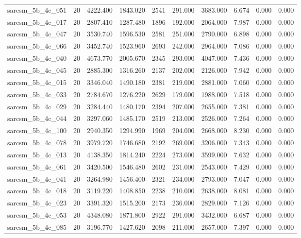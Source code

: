 \begin{tabular}{lrrrrrrrrr}
sarcsm\_5b\_4c\_051 & 20 & 4222.400 & 1843.020 & 2541 & 291.000 & 3683.000 & 6.674 & 0.000 & 0.000 \\
sarcsm\_5b\_4c\_017 & 20 & 2807.410 & 1287.480 & 1896 & 192.000 & 2064.000 & 7.987 & 0.000 & 0.000 \\
sarcsm\_5b\_4c\_047 & 20 & 3530.740 & 1596.530 & 2581 & 251.000 & 2790.000 & 6.898 & 0.000 & 0.000 \\
sarcsm\_5b\_4c\_066 & 20 & 3452.740 & 1523.960 & 2693 & 242.000 & 2964.000 & 7.086 & 0.000 & 0.000 \\
sarcsm\_5b\_4c\_040 & 20 & 4673.770 & 2005.670 & 2345 & 293.000 & 4047.000 & 7.436 & 0.000 & 0.000 \\
sarcsm\_5b\_4c\_045 & 20 & 2885.300 & 1316.260 & 2137 & 202.000 & 2126.000 & 7.942 & 0.000 & 0.000 \\
sarcsm\_5b\_4c\_015 & 20 & 3346.040 & 1490.180 & 2381 & 219.000 & 2881.000 & 7.060 & 0.000 & 0.000 \\
sarcsm\_5b\_4c\_033 & 20 & 2784.670 & 1276.220 & 2629 & 179.000 & 1988.000 & 7.518 & 0.000 & 0.000 \\
sarcsm\_5b\_4c\_029 & 20 & 3284.440 & 1480.170 & 2394 & 207.000 & 2655.000 & 7.381 & 0.000 & 0.000 \\
sarcsm\_5b\_4c\_044 & 20 & 3297.060 & 1485.170 & 2519 & 213.000 & 2526.000 & 7.264 & 0.000 & 0.000 \\
sarcsm\_5b\_4c\_100 & 20 & 2940.350 & 1294.990 & 1969 & 204.000 & 2668.000 & 8.230 & 0.000 & 0.000 \\
sarcsm\_5b\_4c\_078 & 20 & 3979.720 & 1746.680 & 2192 & 269.000 & 3206.000 & 7.343 & 0.000 & 0.000 \\
sarcsm\_5b\_4c\_013 & 20 & 4138.350 & 1814.240 & 2224 & 273.000 & 3599.000 & 7.632 & 0.000 & 0.000 \\
sarcsm\_5b\_4c\_061 & 20 & 3420.500 & 1546.480 & 2602 & 231.000 & 2543.000 & 7.429 & 0.000 & 0.000 \\
sarcsm\_5b\_4c\_041 & 20 & 3264.980 & 1456.400 & 2321 & 234.000 & 2793.000 & 7.047 & 0.000 & 0.000 \\
sarcsm\_5b\_4c\_018 & 20 & 3119.220 & 1408.850 & 2238 & 210.000 & 2638.000 & 8.081 & 0.000 & 0.000 \\
sarcsm\_5b\_4c\_023 & 20 & 3391.320 & 1515.200 & 2173 & 236.000 & 2829.000 & 7.126 & 0.000 & 0.000 \\
sarcsm\_5b\_4c\_053 & 20 & 4348.080 & 1871.800 & 2922 & 291.000 & 3432.000 & 6.687 & 0.000 & 0.000 \\
sarcsm\_5b\_4c\_085 & 20 & 3196.770 & 1427.620 & 2098 & 211.000 & 2657.000 & 7.397 & 0.000 & 0.000 \\

\end{tabular}
